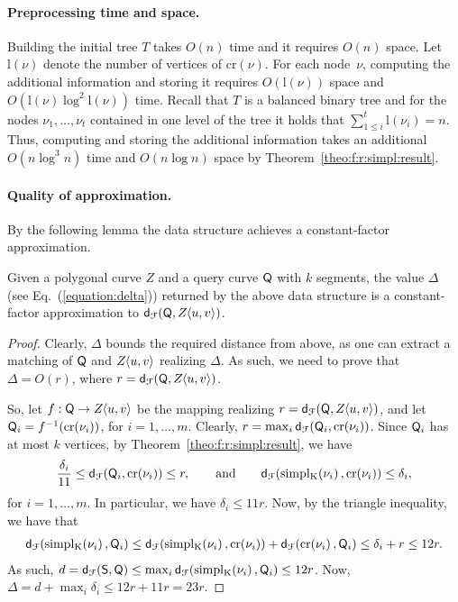\documentclass[12pt]{article}
\newcommand{\thmref}[1]{Theorem~\ref{theo:#1}}
\newcommand{\lemlab}[1]{\label{lemma:#1}}
\newcommand{\Eqref}[1]{Eq.~(\ref{equation:#1})}
\newcommand{\ts}{\hspace{0.6pt}}
\newcommand{\distFr}[2]{\mathsf{d}_{\EuScript{F}}\pth{#1, #2}}
\newcommand{\cS}{\mathsf{S}}
\newcommand{\cZ}{{Z}}
\providecommand{\pth}[2][\!]{#1\left({#2}\right)}
\newcommand{\SC}[3]{{#1}\!\!\ts\ts \left\langle  #2, #3 \right\rangle}
\newcommand{\Tree}{T}
\newcommand{\node}{\nu}
\newcommand{\cNode}[1]{\mathrm{c{}r}\pth{#1}}
\newcommand{\kNode}[2]{\mathrm{s{}i{}m{}p{}l_{#1}}\pth{#2}}
\newcommand{\lNode}[1]{\mathrm{l}\pth{#1}}
\numberwithin{figure}{section}
\numberwithin{equation}{section}
\newcommand{\matching}{matching\xspace}
\newcommand{\Eqlab}[1]{\label{equation:#1}}
\begin{document}
\paragraph{Preprocessing time and space.}
Building the initial tree $\Tree$ takes $O(n)$ time and it requires
$O(n)$ space.  Let $\lNode{\node}$ denote the number of vertices of
$\cNode{\node}$.  For each node~$\node$, computing the additional
information and storing it requires $O(\lNode{\node})$ space and
$O\pth{ \lNode{\node} \log^2 \lNode{\node} }$ time.  Recall that
$\Tree$ is a balanced binary tree and for the nodes $\node_1, \ldots,
\node_{t}$ contained in one level of the tree it holds that $\sum_{1
   \leq i}^{t} \lNode{\node_i} = n$. Thus, computing and storing the
additional information takes an additional $O\pth{ n \log^3 n }$ time
and $O(n \log n)$ space by \thmref{f:r:simpl:result}.



\paragraph{Quality of approximation.}
By the following lemma the data structure achieves a constant-factor
approximation.


\begin{lemma}\lemlab{k:seg:query:vertices}Given a polygonal curve $\cZ$ and a query curve $\mathsf{Q}$ with $k$
    segments, the value $\Delta$ (see \Eqref{delta}) returned by the
    above data structure is a constant-factor approximation to
    $\distFr{\cQ}{\SC{\cZ}{u}{v}}$.
\end{lemma}
\begin{proof}
    Clearly, $\Delta$ bounds the required distance from above, as one
    can extract a \matching{} of $\mathsf{Q}$ and $\SC{\cZ}{u}{v}$ realizing
    $\Delta$. As such, we need to prove that $\Delta= O(r)$, where $r
    = \distFr{\cQ}{\SC{\cZ}{u}{v}}$.
    
    So, let $f:\cQ \rightarrow \SC{\cZ}{u}{v}$ be the mapping
    realizing $r = \distFr{\cQ}{\SC{\cZ}{u}{v}}$, and let $\cQ_i =
    f^{-1}( \cNode{\node_i})$, for $i=1, \ldots, m$. Clearly, $r =
    \max_i \distFr{\cQ_i}{\cNode{\node_i}}$.  Since $\mathsf{Q}_i$ has at
    most $k$ vertices, by \thmref{f:r:simpl:result}, we have
    \begin{align}
        \frac{\delta_i}{11} \leq \distFr{\cQ_i}{\cNode{\node_i}} \leq
        r,
\qquad \text{and}\qquad \distFr{\kNode{K}{\node_i}}{\cNode{\node_i}}\leq \delta_i,\Eqlab{alpha:i:r}
    \end{align}
    for $i=1,\ldots, m$.  In particular, we have $\delta_i \leq 11r$.
    Now, by the triangle inequality, we have that
    \begin{align*}
        \distFr{\kNode{K}{\node_i}}{\cQ_i} \leq \distFr{\kNode{K}{\node_i}}{\cNode{\node_i}} +
        \distFr{\cNode{\node_i}}{\cQ_i}\leq \delta_i + r\leq 12r.
    \end{align*}
    As such, $d = \distFr{\cS}{\cQ} \leq \max_i
    \distFr{\kNode{K}{\node_i}}{\cQ_i} \leq 12r$.  Now, $\Delta = d +
    \max_{i}\delta_i \leq 12r + 11r = 23r$.
\end{proof}
\end{document}
